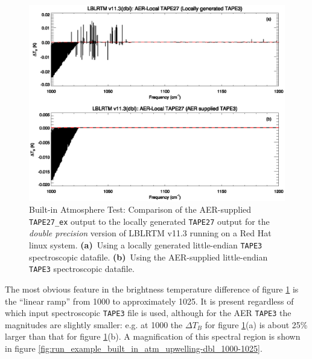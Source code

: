 \begin{figure}[htp]
  \includegraphics[bb=85 226 534 381,clip,scale=1.0]{graphics/run_example_built_in_atm_upwelling/dbl.eps}
  \caption{Built-in Atmosphere Test: Comparison of the AER-supplied \texttt{TAPE27\_ex} output to the locally generated \texttt{TAPE27} output for the \textsl{double precision} version of LBLRTM v11.3 running on a Red Hat linux system. \mbox{\textbf{(a)} Using} a locally generated little-endian \texttt{TAPE3} spectroscopic datafile. \mbox{\textbf{(b)} Using} the AER-supplied little-endian \texttt{TAPE3} spectroscopic datafile.}
  \label{fig:run_example_built_in_atm_upwelling-dbl}
\end{figure}

The most obvious feature in the brightness temperature difference of figure \ref{fig:run_example_built_in_atm_upwelling-dbl} is the ``linear ramp'' from 1000 to approximately 1025\invcm. It is present regardless of which input spectroscopic \texttt{TAPE3} file is used, although for the AER \texttt{TAPE3} the magnitudes are slightly smaller: e.g. at 1000\invcm{} the $\Delta T_B$ for figure \ref{fig:run_example_built_in_atm_upwelling-dbl}(a) is about 25\% larger than that for figure \ref{fig:run_example_built_in_atm_upwelling-dbl}(b). A magnification of this spectral region is shown in figure \ref{fig:run_example_built_in_atm_upwelling-dbl_1000-1025}.

